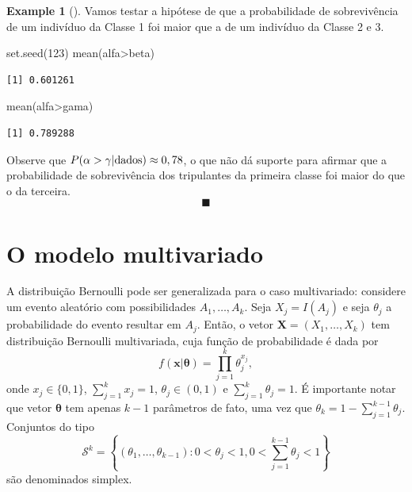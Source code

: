 \documentclass[
  letterpaper,
  DIV=11,
  numbers=noendperiod]{scrreprt}
\newenvironment{Shaded}{\begin{snugshade}}{\end{snugshade}}
\newcommand{\DecValTok}[1]{\textcolor[rgb]{0.68,0.00,0.00}{#1}}
\newcommand{\FunctionTok}[1]{\textcolor[rgb]{0.28,0.35,0.67}{#1}}
\newcommand{\NormalTok}[1]{\textcolor[rgb]{0.00,0.23,0.31}{#1}}
\newcommand{\SpecialCharTok}[1]{\textcolor[rgb]{0.37,0.37,0.37}{#1}}
\theoremstyle{definition}
\theoremstyle{definition}
\newtheorem{example}{Example}[chapter]
\theoremstyle{plain}
\theoremstyle{remark}
\begin{document}
\begin{example}[]
Vamos testar a hipótese de que a probabilidade de sobrevivência de um
indivíduo da Classe 1 foi maior que a de um indivíduo da Classe 2 e 3.

\begin{Shaded}
\begin{Highlighting}[]
\FunctionTok{set.seed}\NormalTok{(}\DecValTok{123}\NormalTok{)}
\FunctionTok{mean}\NormalTok{(alfa}\SpecialCharTok{\textgreater{}}\NormalTok{beta)}
\end{Highlighting}
\end{Shaded}

\begin{verbatim}
[1] 0.601261
\end{verbatim}

\begin{Shaded}
\begin{Highlighting}[]
\FunctionTok{mean}\NormalTok{(alfa}\SpecialCharTok{\textgreater{}}\NormalTok{gama)}
\end{Highlighting}
\end{Shaded}

\begin{verbatim}
[1] 0.789288
\end{verbatim}

Observe que \(P(\alpha>\gamma|\hbox{dados})\approx 0,78\), o que não dá
suporte para afirmar que a probabilidade de sobrevivência dos
tripulantes da primeira classe foi maior do que o da terceira.
\[\blacksquare\]

\end{example}

\section{O modelo multivariado}\label{o-modelo-multivariado}

A distribuição Bernoulli pode ser generalizada para o caso multivariado:
considere um evento aleatório com possibilidades \(A_1,\ldots,A_k\).
Seja \(X_j=I(A_j)\) e seja \(\theta_j\) a probabilidade do evento
resultar em \(A_j\). Então, o vetor \(\boldsymbol{X}=(X_1,\ldots,X_k)\)
tem distribuição Bernoulli multivariada, cuja função de probabilidade é
dada por
\[f(\boldsymbol{x}|\boldsymbol{\theta})=\prod_{j=1}^k\theta_j^{x_{j}},\]
onde \(x_j\in\{0,1\}\), \(\sum_{j=1}^kx_j=1\), \(\theta_j\in(0,1)\) e
\(\sum_{j=1}^k\theta_j=1\). É importante notar que vetor
\(\boldsymbol{\theta}\) tem apenas \(k-1\) parâmetros de fato, uma vez
que \(\theta_k=1-\sum_{j=1}^{k-1}\theta_j\). Conjuntos do tipo
\[\mathcal{S}^k=\left\{(\theta_1,\ldots,\theta_{k-1}):0<\theta_j<1,0<\sum_{j=1}^{k-1}\theta_j<1\right\}\]
são denominados simplex.
\end{document}
